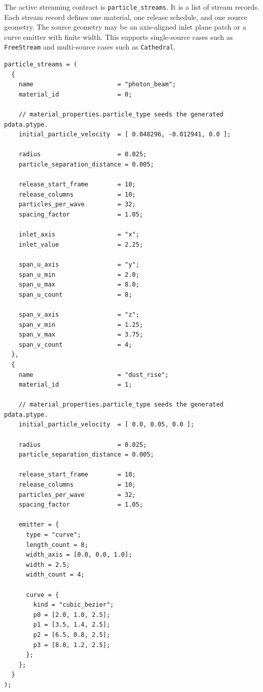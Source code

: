 The active streaming contract is \texttt{particle\_streams}.  It is a list of
stream records.  Each stream record defines one material, one release schedule,
and one source geometry.  The source geometry may be an axis-aligned inlet
plane patch or a curve emitter with finite width.  This supports single-source
cases such as \texttt{FreeStream} and multi-source cases such as
\texttt{Cathedral}.

\begin{verbatim}
particle_streams = (
  {
    name                       = "photon_beam";
    material_id                = 0;

    // material_properties.particle_type seeds the generated pdata.ptype.
    initial_particle_velocity  = [ 0.048296, -0.012941, 0.0 ];

    radius                     = 0.025;
    particle_separation_distance = 0.005;

    release_start_frame        = 10;
    release_columns            = 10;
    particles_per_wave         = 32;
    spacing_factor             = 1.05;

    inlet_axis                 = "x";
    inlet_value                = 2.25;

    span_u_axis                = "y";
    span_u_min                 = 2.0;
    span_u_max                 = 8.0;
    span_u_count               = 8;

    span_v_axis                = "z";
    span_v_min                 = 1.25;
    span_v_max                 = 3.75;
    span_v_count               = 4;
  },
  {
    name                       = "dust_rise";
    material_id                = 1;

    // material_properties.particle_type seeds the generated pdata.ptype.
    initial_particle_velocity  = [ 0.0, 0.05, 0.0 ];

    radius                     = 0.025;
    particle_separation_distance = 0.005;

    release_start_frame        = 10;
    release_columns            = 10;
    particles_per_wave         = 32;
    spacing_factor             = 1.05;

    emitter = {
      type = "curve";
      length_count = 8;
      width_axis = [0.0, 0.0, 1.0];
      width = 2.5;
      width_count = 4;

      curve = {
        kind = "cubic_bezier";
        p0 = [2.0, 1.0, 2.5];
        p1 = [3.5, 1.4, 2.5];
        p2 = [6.5, 0.8, 2.5];
        p3 = [8.0, 1.2, 2.5];
      };
    };
  }
);
\end{verbatim}

